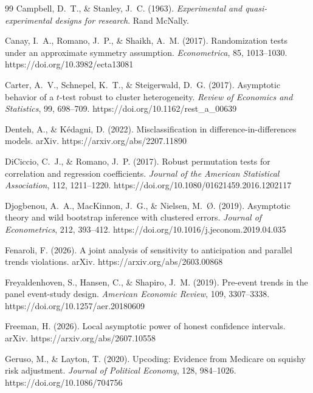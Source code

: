 \documentclass[12pt]{article}
\theoremstyle{definition}
\numberwithin{equation}{section}
\begin{document}
\begin{thebibliography}{99}
 Campbell, D.~T., \& Stanley, J.~C. (1963). \emph{Experimental and quasi-experimental designs for research}. Rand McNally.

 Canay, I.~A., Romano, J.~P., \& Shaikh, A.~M. (2017). Randomization tests under an approximate symmetry assumption. \emph{Econometrica}, 85, 1013--1030. https://doi.org/10.3982/ecta13081

 Carter, A.~V., Schnepel, K.~T., \& Steigerwald, D.~G. (2017). Asymptotic behavior of a $t$-test robust to cluster heterogeneity. \emph{Review of Economics and Statistics}, 99, 698--709. https://doi.org/10.1162/rest\_a\_00639

 Denteh, A., \& K\'edagni, D. (2022). Misclassification in difference-in-differences models. arXiv. https://arxiv.org/abs/2207.11890

 DiCiccio, C.~J., \& Romano, J.~P. (2017). Robust permutation tests for correlation and regression coefficients. \emph{Journal of the American Statistical Association}, 112, 1211--1220. https://doi.org/10.1080/01621459.2016.1202117

 Djogbenou, A.~A., MacKinnon, J.~G., \& Nielsen, M.~{\O}. (2019). Asymptotic theory and wild bootstrap inference with clustered errors. \emph{Journal of Econometrics}, 212, 393--412. https://doi.org/10.1016/j.jeconom.2019.04.035

 Fenaroli, F. (2026). A joint analysis of sensitivity to anticipation and parallel trends violations. arXiv. https://arxiv.org/abs/2603.00868

 Freyaldenhoven, S., Hansen, C., \& Shapiro, J.~M. (2019). Pre-event trends in the panel event-study design. \emph{American Economic Review}, 109, 3307--3338. https://doi.org/10.1257/aer.20180609

 Freeman, H. (2026). Local asymptotic power of honest confidence intervals. arXiv. https://arxiv.org/abs/2607.10558

 Geruso, M., \& Layton, T. (2020). Upcoding: Evidence from Medicare on squishy risk adjustment. \emph{Journal of Political Economy}, 128, 984--1026. https://doi.org/10.1086/704756


\end{thebibliography}
\end{document}
